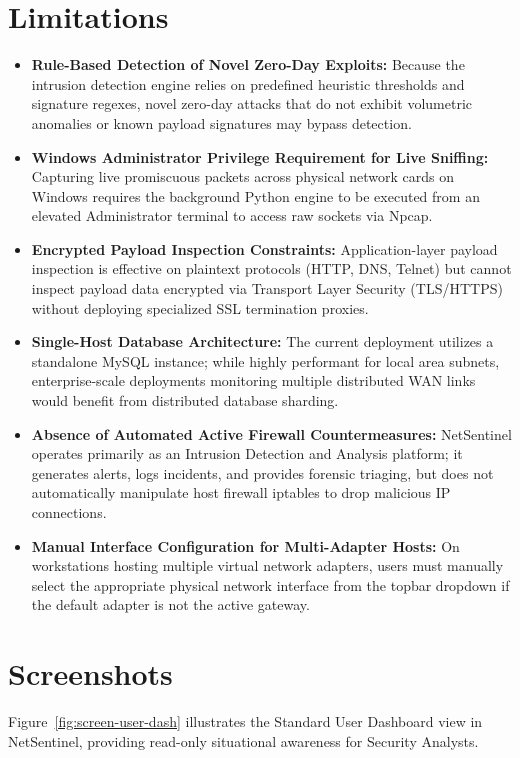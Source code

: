 \documentclass[a4paper,12pt]{report}
\begin{document}
	\section{Limitations}
	\begin{itemize}
		\item \textbf{Rule-Based Detection of Novel Zero-Day Exploits:}
		Because the intrusion detection engine relies on predefined heuristic thresholds and signature regexes, novel zero-day attacks that do not exhibit volumetric anomalies or known payload signatures may bypass detection.
		
		\item \textbf{Windows Administrator Privilege Requirement for Live Sniffing:}
		Capturing live promiscuous packets across physical network cards on Windows requires the background Python engine to be executed from an elevated Administrator terminal to access raw sockets via Npcap.
		
		\item \textbf{Encrypted Payload Inspection Constraints:}
		Application-layer payload inspection is effective on plaintext protocols (HTTP, DNS, Telnet) but cannot inspect payload data encrypted via Transport Layer Security (TLS/HTTPS) without deploying specialized SSL termination proxies.
		
		\item \textbf{Single-Host Database Architecture:}
		The current deployment utilizes a standalone MySQL instance; while highly performant for local area subnets, enterprise-scale deployments monitoring multiple distributed WAN links would benefit from distributed database sharding.
		
		\item \textbf{Absence of Automated Active Firewall Countermeasures:}
		NetSentinel operates primarily as an Intrusion Detection and Analysis platform; it generates alerts, logs incidents, and provides forensic triaging, but does not automatically manipulate host firewall iptables to drop malicious IP connections.
		
		\item \textbf{Manual Interface Configuration for Multi-Adapter Hosts:}
		On workstations hosting multiple virtual network adapters, users must manually select the appropriate physical network interface from the topbar dropdown if the default adapter is not the active gateway.
	\end{itemize}
	
	\newpage
	\section{Screenshots}
	\par
	Figure~\ref{fig:screen-user-dash} illustrates the Standard User Dashboard view in NetSentinel, providing read-only situational awareness for Security Analysts.
	
\end{document}
